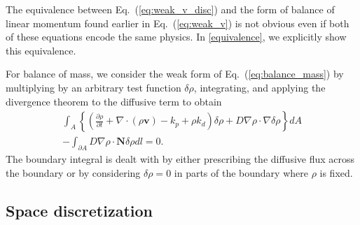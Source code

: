 \documentclass[12pt]{iopart}
\begin{document}
The equivalence between Eq.~(\ref{eq:weak_v_disc}) and the form of balance of linear momentum found earlier in Eq.~(\ref{eq:weak_v}) is not obvious even if both of these equations encode the same physics. In \ref{equivalence}, we explicitly show this equivalence. 

For balance of mass, we consider the weak form of Eq.~(\ref{eq:balance_mass}) by  multiplying by an arbitrary test function $\delta\rho$, integrating, and applying the divergence theorem to the diffusive term to obtain
	\begin{eqnarray}
		\int_A \left \{\left(  \frac{\partial \rho}{\partial t} +  \nabla \cdot (\rho \bm{v}) - k_p  +\rho k_d\right) \delta \rho  + D\nabla \rho \cdot \nabla \delta \rho \right \} dA \nonumber \\ 	-  \int_{\partial A} D  \nabla \rho \cdot \bm{N} \delta \rho  dl  = 0.  \label{eq:weak_mass}
	\end{eqnarray}
	The boundary integral is dealt with by either prescribing the diffusive flux across the boundary or by considering $\delta\rho=0$ in parts of the boundary where $\rho$ is fixed.
	
	\subsection{Space discretization}
	
\end{document}
